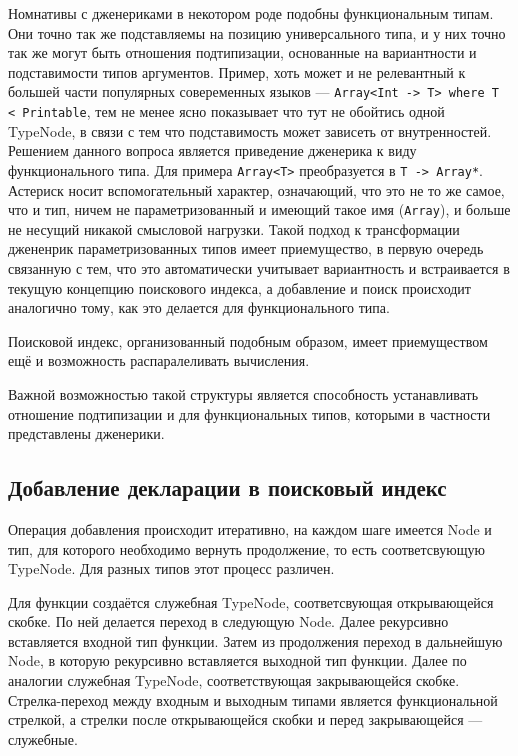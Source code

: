 \documentclass[times]{itmo-student-thesis}
\begin{document}
	Номнативы с дженериками в некотором роде подобны функциональным типам. Они точно так же подставляемы на позицию универсального типа, и у них точно так же могут быть отношения подтипизации, основанные на вариантности и подставимости типов аргументов. Пример, хоть может и не релевантный к большей части популярных совеременных языков --- \lstinline{Array<Int -> T> where T < Printable}, тем не менее ясно показывает что тут не обойтись одной TypeNode, в связи с тем что подставимость может зависеть от внутренностей. Решением данного вопроса является приведение дженерика к виду функционального типа. Для примера \lstinline{Array<T>} преобразуется в \lstinline{T -> Array*}. Астериск носит вспомогательный характер, означающий, что это не то же самое, что и тип, ничем не параметризованный и имеющий такое имя (\lstinline{Array}), и больше не несущий никакой смысловой нагрузки. Такой подход к трансформации джененрик параметризованных типов имеет приемущество, в первую очередь связанную с тем, что это автоматически учитывает вариантность и встраивается в текущую концепцию поискового индекса, а добавление и поиск происходит аналогично тому, как это делается для функционального типа.
	
	Поисковой индекс, организованный подобным образом, имеет приемуществом ещё и возможность распаралеливать вычисления.
	
	Важной возможностью такой структуры является способность устанавливать отношение подтипизации и для функциональных типов, которыми в частности представлены дженерики.
	
	\subsection{Добавление декларации в поисковый индекс}
	Операция добавления происходит итеративно, на каждом шаге имеется Node и тип, для которого необходимо вернуть продолжение, то есть соответсвующую TypeNode. Для разных типов этот процесс различен.
	
	Для функции создаётся служебная TypeNode, соответсвующая открывающейся скобке. По ней делается переход в следующую Node. Далее рекурсивно вставляется входной тип функции. Затем из продолжения переход в дальнейшую Node, в которую рекурсивно вставляется выходной тип функции. Далее по аналогии служебная TypeNode, соответствующая закрывающейся скобке. Стрелка-переход между входным и выходным типами является функциональной стрелкой, а стрелки после открывающейся скобки и перед закрывающейся --- служебные.
	
\end{document}
